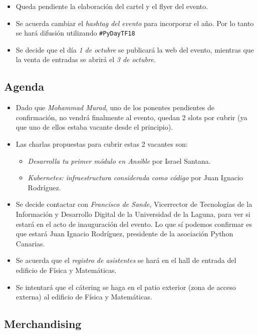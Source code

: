\documentclass[a4paper, 12pt]{article}
\begin{document}
    \begin{itemize}
        \item Queda pendiente la elaboración del cartel y el flyer del evento.
        \item Se acuerda cambiar el \textit{hashtag del evento} para incorporar el año. Por lo tanto se hará difusión utilizando \texttt{\#PyDayTF18}
        \item Se decide que el día \textit{1 de octubre} se publicará la web del evento, mientras que la venta de entradas se abrirá el \textit{3 de octubre}.
    \end{itemize}

    \subsection*{Agenda}

    \begin{itemize}
        \item Dado que \textit{Mohammad Murad}, uno de los ponentes pendientes de confirmación, no vendrá finalmente al evento, quedan 2 slots por cubrir (ya que uno de ellos estaba vacante desde el principio).
        \item Las charlas propuestas para cubrir estas 2 vacantes son:
        \begin{itemize}
            \item \textit{Desarrolla tu primer módulo en Ansible} por Israel Santana.
            \item \textit{Kubernetes: infraestructura considerada como código} por Juan Ignacio Rodríguez.
        \end{itemize}
        \item Se decide contactar con \textit{Francisco de Sande}, Vicerrector de Tecnologías de la Información y Desarrollo Digital de la Universidad de la Laguna, para ver si estará en el acto de inauguración del evento. Lo que sí podemos confirmar es que estará Juan Ignacio Rodríguez, presidente de la asociación Python Canarias.
        \item Se acuerda que el \textit{registro de asistentes} se hará en el hall de entrada del edificio de Física y Matemáticas.
        \item Se intentará que el cátering se haga en el patio exterior (zona de acceso externa) al edificio de Física y Matemáticas.
    \end{itemize}

    \subsection*{Merchandising}
\end{document}

